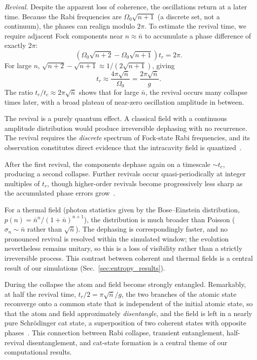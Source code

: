 \documentclass[12pt]{iopart}
\begin{document}
\textit{Revival.} Despite the apparent loss of coherence, the oscillations return at a later time. Because the Rabi frequencies are $\Omega_0\sqrt{n+1}$ (a discrete set, not a continuum), the phases can realign modulo $2\pi$. To estimate the revival time, we require adjacent Fock components near $n \approx \bar{n}$ to accumulate a phase difference of exactly $2\pi$:
\begin{equation}
\left(\Omega_0\sqrt{n+2} - \Omega_0\sqrt{n+1}\right) t_r = 2\pi.
\end{equation}
For large $n$, $\sqrt{n+2} - \sqrt{n+1} \approx 1/(2\sqrt{n+1})$, giving
\begin{equation}
t_r \approx \frac{4\pi\sqrt{\bar{n}}}{\Omega_0} = \frac{2\pi\sqrt{\bar{n}}}{g}.
\label{eq:t_revival}
\end{equation}
The ratio $t_r/t_c \approx 2\pi\sqrt{\bar{n}}$ shows that for large $\bar{n}$, the revival occurs many collapse times later, with a broad plateau of near-zero oscillation amplitude in between.

The revival is a purely quantum effect. A classical field with a continuous amplitude distribution would produce irreversible dephasing with no recurrence. The revival requires the \textit{discrete} spectrum of Fock-state Rabi frequencies, and its observation constitutes direct evidence that the intracavity field is quantized~\cite{eberly1980, haroche2006}.

After the first revival, the components dephase again on a timescale $\sim t_c$, producing a second collapse. Further revivals occur quasi-periodically at integer multiples of $t_r$, though higher-order revivals become progressively less sharp as the accumulated phase errors grow~\cite{gerry2004}.

For a thermal field (photon statistics given by the Bose--Einstein distribution, $p(n) = \bar{n}^n/(1+\bar{n})^{n+1}$), the distribution is much broader than Poisson ($\sigma_n \sim \bar{n}$ rather than $\sqrt{\bar{n}}$). The dephasing is correspondingly faster, and no pronounced revival is resolved within the simulated window; the evolution nevertheless remains unitary, so this is a loss of visibility rather than a strictly irreversible process. This contrast between coherent and thermal fields is a central result of our simulations (Sec.~\ref{sec:entropy_results}).

During the collapse the atom and field become strongly entangled. Remarkably, at half the revival time, $t_r/2 = \pi\sqrt{\bar{n}}/g$, the two branches of the atomic state reconverge onto a common state that is independent of the initial atomic state, so that the atom and field approximately \emph{disentangle}, and the field is left in a nearly pure Schr\"{o}dinger cat state, a superposition of two coherent states with opposite phases~\cite{gea-banacloche1990, gea-banacloche1991, phoenix1991}. This connection between Rabi collapse, transient entanglement, half-revival disentanglement, and cat-state formation is a central theme of our computational results.
\end{document}
